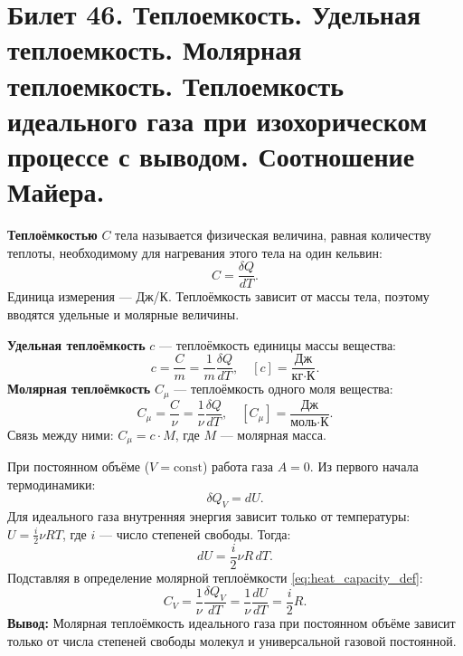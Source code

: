 \section{Билет 46. Теплоемкость. Удельная теплоемкость. Молярная теплоемкость. Теплоемкость идеального газа при изохорическом процессе с выводом. Соотношение Майера.}

\begin{definition}
\textbf{Теплоёмкостью} $C$ тела называется физическая величина, равная количеству теплоты, необходимому для нагревания этого тела на один кельвин:
\begin{equation}
    C = \frac{\delta Q}{dT}. \label{eq:heat_capacity_def}
\end{equation}
Единица измерения --- Дж/К. Теплоёмкость зависит от массы тела, поэтому вводятся удельные и молярные величины.
\end{definition}

\begin{definition}
\textbf{Удельная теплоёмкость} $c$ --- теплоёмкость единицы массы вещества:
\begin{equation}
    c = \frac{C}{m} = \frac{1}{m} \frac{\delta Q}{dT}, \quad \left[ c \right] = \frac{\text{Дж}}{\text{кг} \cdot \text{К}}.
\end{equation}
\textbf{Молярная теплоёмкость} $C_\mu$ --- теплоёмкость одного моля вещества:
\begin{equation}
    C_\mu = \frac{C}{\nu} = \frac{1}{\nu} \frac{\delta Q}{dT}, \quad \left[ C_\mu \right] = \frac{\text{Дж}}{\text{моль} \cdot \text{К}}.
\end{equation}
Связь между ними: $C_\mu = c \cdot M$, где $M$ --- молярная масса.
\end{definition}

\begin{theorem}
При постоянном объёме ($V = \text{const}$) работа газа $A = 0$. Из первого начала термодинамики:
\begin{equation}
    \delta Q_V = dU.
\end{equation}
Для идеального газа внутренняя энергия зависит только от температуры: $U = \frac{i}{2} \nu R T$, где $i$ --- число степеней свободы. Тогда:
\begin{equation}
    dU = \frac{i}{2} \nu R \, dT.
\end{equation}
Подставляя в определение молярной теплоёмкости \eqref{eq:heat_capacity_def}:
\begin{equation}
    C_V = \frac{1}{\nu} \frac{\delta Q_V}{dT} = \frac{1}{\nu} \frac{dU}{dT} = \frac{i}{2} R. \label{eq:Cv_ideal}
\end{equation}
\textbf{Вывод:} Молярная теплоёмкость идеального газа при постоянном объёме зависит только от числа степеней свободы молекул и универсальной газовой постоянной.
\end{theorem}


